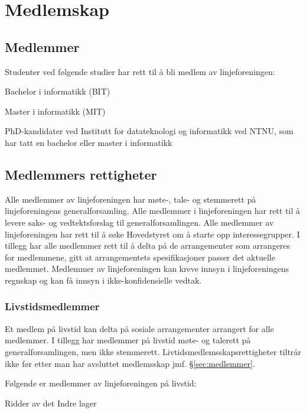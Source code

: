 \chapter{Medlemskap}\label{chapter:medlemskap}

\section{Medlemmer}{\label{sec:medlemmer}
\vspace{23pt}

Studenter ved følgende studier har rett til å bli medlem av linjeforeningen:
\begin{liste}
	\item Bachelor i informatikk (BIT)
	\item Master i informatikk (MIT)
    \item PhD-kandidater ved Institutt for datateknologi og informatikk ved NTNU, som har tatt en bachelor eller master i informatikk
\end{liste} 
}
\section{Medlemmers rettigheter}
\vspace{23pt}
Alle medlemmer av linjeforeningen har møte-, tale- og stemmerett på linjeforeningens generalforsamling. Alle medlemmer i linjeforeningen har rett til å levere saks- og vedtektsforslag til generalforsamlingen. Alle medlemmer av linjeforeningen har rett til å søke Hovedstyret om å starte opp interessegrupper. I tillegg har alle medlemmer rett til å delta på de arrangementer som arrangeres for medlemmene, gitt at arrangementets spesifikasjoner passer det aktuelle medlemmet. Medlemmer av linjeforeningen kan kreve innsyn i linjeforeningens regnskap og kan få innsyn i ikke-konfidensielle vedtak. 

\subsection{Livstidsmedlemmer}{
Et medlem på livstid kan delta på sosiale arrangementer arrangert for alle medlemmer. I tillegg har medlemmer på livstid møte- og talerett på generalforsamlingen, men ikke stemmerett. Livtidsmedlemsskapsrettigheter tiltrår ikke før etter man har avsluttet medlemsskap jmf. §\ref{sec:medlemmer}.

Følgende er medlemmer av linjeforeningen på livstid:
\begin{liste}
	\item Ridder av det Indre lager
\end{liste}

}
